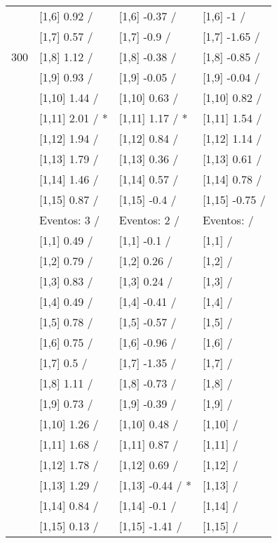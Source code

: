 \begin{table}
\begin{tabular}[t]{llll}
 & {}[1,6] 0.92  / & {}[1,6] -0.37  / & {}[1,6] -1  /\\
 & {}[1,7] 0.57  / & {}[1,7] -0.9  / & {}[1,7] -1.65  /\\
300 & {}[1,8] 1.12  / & {}[1,8] -0.38  / & {}[1,8] -0.85  /\\
\addlinespace
 & {}[1,9] 0.93  / & {}[1,9] -0.05  / & {}[1,9] -0.04  /\\
 & {}[1,10] 1.44  / & {}[1,10] 0.63  / & {}[1,10] 0.82  /\\
 & {}[1,11] 2.01  / * & {}[1,11] 1.17  / * & {}[1,11] 1.54  /\\
 & {}[1,12] 1.94  / & {}[1,12] 0.84  / & {}[1,12] 1.14  /\\
 & {}[1,13] 1.79  / & {}[1,13] 0.36  / & {}[1,13] 0.61  /\\
\addlinespace
 & {}[1,14] 1.46  / & {}[1,14] 0.57  / & {}[1,14] 0.78  /\\
 & {}[1,15] 0.87  / & {}[1,15] -0.4  / & {}[1,15] -0.75  /\\
 & Eventos:  3 / & Eventos:  2 / & Eventos:   /\\
 & {}[1,1] 0.49  / & {}[1,1] -0.1  / & {}[1,1]  /\\
 & {}[1,2] 0.79  / & {}[1,2] 0.26  / & {}[1,2]  /\\
\addlinespace
 & {}[1,3] 0.83  / & {}[1,3] 0.24  / & {}[1,3]  /\\
 & {}[1,4] 0.49  / & {}[1,4] -0.41  / & {}[1,4]  /\\
 & {}[1,5] 0.78  / & {}[1,5] -0.57  / & {}[1,5]  /\\
 & {}[1,6] 0.75  / & {}[1,6] -0.96  / & {}[1,6]  /\\
 & {}[1,7] 0.5  / & {}[1,7] -1.35  / & {}[1,7]  /\\
\addlinespace
500 & {}[1,8] 1.11  / & {}[1,8] -0.73  / & {}[1,8]  /\\
 & {}[1,9] 0.73  / & {}[1,9] -0.39  / & {}[1,9]  /\\
 & {}[1,10] 1.26  / & {}[1,10] 0.48  / & {}[1,10]  /\\
 & {}[1,11] 1.68  / & {}[1,11] 0.87  / & {}[1,11]  /\\
 & {}[1,12] 1.78  / & {}[1,12] 0.69  / & {}[1,12]  /\\
\addlinespace
 & {}[1,13] 1.29  / & {}[1,13] -0.44  / * & {}[1,13]  /\\
 & {}[1,14] 0.84  / & {}[1,14] -0.1  / & {}[1,14]  /\\
 & {}[1,15] 0.13  / & {}[1,15] -1.41  / & {}[1,15]  /\\
\bottomrule
\end{tabular}
\end{table}
